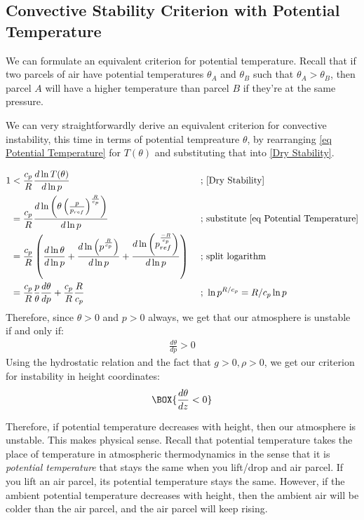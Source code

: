 \subsection{Convective Stability Criterion with Potential Temperature}

We can formulate an equivalent criterion for potential temperature. Recall that if two parcels of air have potential temperatures \(\theta_A\) and \(\theta_B\) such that \(\theta_A>\theta_B\), then parcel \(A\) will have a higher temperature than parcel \(B\) if they're at the same pressure.

We can very straightforwardly derive an equivalent criterion for convective instability, this time in terms of potential tempreature \(\theta\), by rearranging \ref{eq Potential Temperature} for \(T(\theta)\) and substituting that into \ref{Dry Stability}.

\begin{align*}
    1&<\frac{c_p}{R}\frac{d\ln T(\theta)}{d\ln p}
    &\text{ ; }&\text{\ref{Dry Stability}}
    \\
    &=\frac{c_p}{R}\frac{d\ln \left( \theta\left( \frac{p}{p_{ref}} \right)^{\frac{R}{c_p}} \right)}{d\ln p}
    &\text{ ; }&\text{substitute \ref{eq Potential Temperature}}
    \\
    &=\frac{c_p}{R} \left( 
        \frac{d \ln \theta}{d \ln p}+
        \frac{d \ln \left(p^{\frac{R}{c_p}} \right)}{d \ln p}+
        \frac{d \ln \left(p_{ref}^{\frac{-R}{c_p}} \right)}{d \ln p}
     \right)
    &\text{ ; }&\text{split logarithm}
    \\
    &=\frac{c_p}{R}\frac{p}{\theta}\frac{d\theta}{dp}+\frac{c_p}{R}\frac{R}{c_p}
    &\text{ ; }
    &\ln p^{R/c_p}=R/c_p\ln p
\end{align*}
Therefore, since \(\theta>0\) and \(p>0\) always, we get that our atmosphere is unstable if and only if:
\begin{align}\label{Dry Stability Potential Temperature}
    \boxed{\frac{d\theta}{dp}>0}
\end{align}
Using the hydrostatic relation and the fact that \(g>0,\rho>0\), we get our criterion for instability in height coordinates:
\begin{align}
    \BOX{\frac{d\theta}{dz}<0}
\end{align}

Therefore, if potential temperature decreases with height, then our atmosphere is unstable. This makes physical sense. Recall that potential temperature takes the place of temperature in atmospheric thermodynamics in the sense that it is \textit{potential temperature} that stays the same when you lift/drop and air parcel. If you lift an air parcel, its potential temperature stays the same. However, if the ambient potential temperature decreases with height, then the ambient air will be colder than the air parcel, and the air parcel will keep rising.

